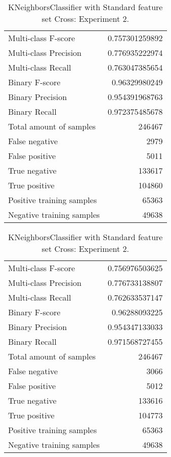 \begin{table}[H]
\begin{minipage}{0.5\textwidth}
\caption{KNeighborsClassifier with Standard feature set Cross: Experiment 1.}
\centering
\begin{tabular}{l r}
\toprule
Multi-class F-score & 0.757301259892 \\
Multi-class Precision & 0.776935222974 \\
Multi-class Recall & 0.763047385654 \\
\midrule
Binary F-score & 0.96329980249 \\
Binary Precision & 0.954391968763 \\
Binary Recall & 0.972375485678 \\
\midrule
Total amount of samples & 246467 \\
False negative & 2979 \\
False positive & 5011 \\
True negative & 133617 \\
True positive & 104860 \\
\midrule
Positive training samples & 65363 \\
Negative training samples & 49638 \\
\bottomrule
\end{tabular}
\end{minipage}
\hfillx
\begin{minipage}{0.5\textwidth}
\caption{KNeighborsClassifier with Standard feature set Cross: Experiment 2.}
\centering
\begin{tabular}{l r}
\toprule
Multi-class F-score & 0.756976503625 \\
Multi-class Precision & 0.776733138807 \\
Multi-class Recall & 0.762633537147 \\
\midrule
Binary F-score & 0.96288093225 \\
Binary Precision & 0.954347133033 \\
Binary Recall & 0.971568727455 \\
\midrule
Total amount of samples & 246467 \\
False negative & 3066 \\
False positive & 5012 \\
True negative & 133616 \\
True positive & 104773 \\
\midrule
Positive training samples & 65363 \\
Negative training samples & 49638 \\
\bottomrule
\end{tabular}
\end{minipage}
\end{table}
